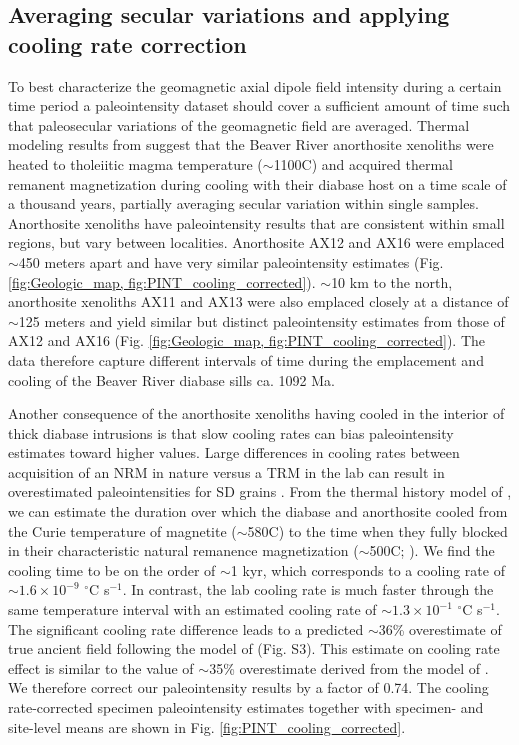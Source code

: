 \documentclass[9pt,twocolumn,twoside,lineno]{pnas-new}
\begin{document}
\subsection*{Averaging secular variations and applying cooling rate correction}
To best characterize the geomagnetic axial dipole field intensity during a certain time period a paleointensity dataset should cover a sufficient amount of time such that paleosecular variations of the geomagnetic field are averaged. Thermal modeling results from \citealp{Zhang2021b} suggest that the Beaver River anorthosite xenoliths were heated to tholeiitic magma temperature ($\sim$1100\textdegree C) and acquired thermal remanent magnetization during cooling with their diabase host on a time scale of a thousand years, partially averaging secular variation within single samples. Anorthosite xenoliths have paleointensity results that are consistent within small regions, but vary between localities. Anorthosite AX12 and AX16 were emplaced $\sim$450 meters apart and have very similar paleointensity estimates (Fig. \ref{fig:Geologic_map, fig:PINT_cooling_corrected}). $\sim$10 km to the north, anorthosite xenoliths AX11 and AX13 were also emplaced closely at a distance of $\sim$125 meters and yield similar but distinct paleointensity estimates from those of AX12 and AX16 (Fig. \ref{fig:Geologic_map, fig:PINT_cooling_corrected}). The data therefore capture different intervals of time during the emplacement and cooling of the Beaver River diabase sills ca. 1092 Ma. 

Another consequence of the anorthosite xenoliths having cooled in the interior of thick diabase intrusions is that slow cooling rates can bias paleointensity estimates toward higher values. Large differences in cooling rates between acquisition of an NRM in nature versus a TRM in the lab can result in overestimated paleointensities for SD grains \cite{Dodson1980a, Halgedahl1980a, Nagy2021a}. From the thermal history model of  \citealp{Zhang2021b}, we can estimate the duration over which the diabase and anorthosite cooled from the Curie temperature of magnetite ($\sim$580\textdegree C) to the time when they fully blocked in their characteristic natural remanence magnetization ($\sim$500\textdegree C;  \citealp{Zhang2021b}). We find the cooling time to be on the order of $\sim$1 kyr, which corresponds to a cooling rate of $\sim1.6\times10^{-9}$ $^\circ$C s$^{-1}$. In contrast, the lab cooling rate is much faster through the same temperature interval with an estimated cooling rate of $\sim1.3\times10^{-1}$ $^\circ$C s$^{-1}$. The significant cooling rate difference leads to a predicted $\sim$36\% overestimate of true ancient field following the model of \citealp{Halgedahl1980a} (Fig. S3). This estimate on cooling rate effect is similar to the value of $\sim$35\% overestimate derived from the model of \citealp{Nagy2021a}. We therefore correct our paleointensity results by a factor of 0.74. The cooling rate-corrected specimen paleointensity estimates together with specimen- and site-level means are shown in Fig. \ref{fig:PINT_cooling_corrected}.
\end{document}
